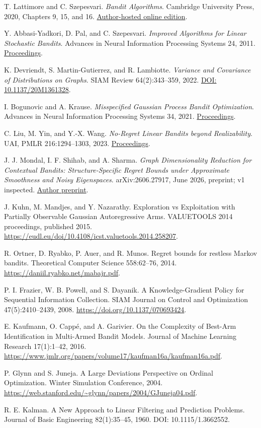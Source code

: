 T. Lattimore and C. Szepesvari.
\emph{Bandit Algorithms}.
Cambridge University Press, 2020, Chapters 9, 15, and 16.
\href{https://tor-lattimore.com/downloads/book/book.pdf}{Author-hosted online edition}.

Y. Abbasi-Yadkori, D. Pal, and C. Szepesvari.
\emph{Improved Algorithms for Linear Stochastic Bandits}.
Advances in Neural Information Processing Systems 24, 2011.
\href{https://proceedings.neurips.cc/paper_files/paper/2011/hash/e1d5be1c7f2f456670de3d53c7b54f4a-Abstract.html}{Proceedings}.

K. Devriendt, S. Martin-Gutierrez, and R. Lambiotte.
\emph{Variance and Covariance of Distributions on Graphs}.
SIAM Review 64(2):343--359, 2022.
\href{https://doi.org/10.1137/20M1361328}{DOI: 10.1137/20M1361328}.

I. Bogunovic and A. Krause.
\emph{Misspecified Gaussian Process Bandit Optimization}.
Advances in Neural Information Processing Systems 34, 2021.
\href{https://papers.neurips.cc/paper_files/paper/2021/hash/177db6acfe388526a4c7bff88e1feb15-Abstract.html}{Proceedings}.

C. Liu, M. Yin, and Y.-X. Wang.
\emph{No-Regret Linear Bandits beyond Realizability}.
UAI, PMLR 216:1294--1303, 2023.
\href{https://proceedings.mlr.press/v216/liu23c.html}{Proceedings}.

J. J. Mondal, I. F. Shihab, and A. Sharma.
\emph{Graph Dimensionality Reduction for Contextual Bandits:
Structure-Specific Regret Bounds under Approximate Smoothness and Noisy Eigenspaces}.
arXiv:2606.27917, June 2026, preprint; v1 inspected.
\href{https://arxiv.org/html/2606.27917v1}{Author preprint}.

J. Kuhn, M. Mandjes, and Y. Nazarathy. Exploration vs Exploitation with Partially Observable Gaussian Autoregressive Arms. VALUETOOLS 2014 proceedings, published 2015. \url{https://eudl.eu/doi/10.4108/icst.valuetools.2014.258207}.

R. Ortner, D. Ryabko, P. Auer, and R. Munos. Regret bounds for restless Markov bandits. Theoretical Computer Science 558:62--76, 2014. \url{https://daniil.ryabko.net/mabajr.pdf}.

P. I. Frazier, W. B. Powell, and S. Dayanik. A Knowledge-Gradient Policy for Sequential Information Collection. SIAM Journal on Control and Optimization 47(5):2410--2439, 2008. \url{https://doi.org/10.1137/070693424}.

E. Kaufmann, O. Capp\'e, and A. Garivier. On the Complexity of Best-Arm Identification in Multi-Armed Bandit Models. Journal of Machine Learning Research 17(1):1--42, 2016. \url{https://www.jmlr.org/papers/volume17/kaufman16a/kaufman16a.pdf}.

P. Glynn and S. Juneja. A Large Deviations Perspective on Ordinal Optimization. Winter Simulation Conference, 2004. \url{https://web.stanford.edu/~glynn/papers/2004/GJuneja04.pdf}.

R. E. Kalman. A New Approach to Linear Filtering and Prediction Problems. Journal of Basic Engineering 82(1):35--45, 1960. DOI: 10.1115/1.3662552.
